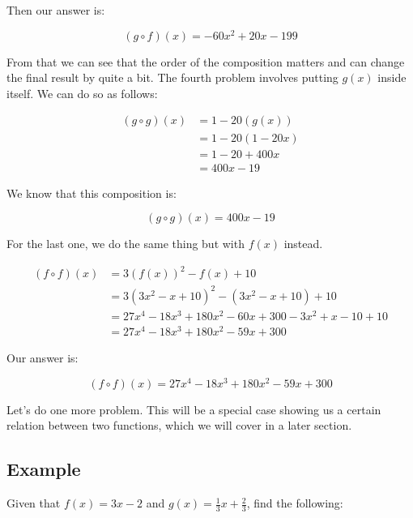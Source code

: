 \documentclass[12pt]{article}
\begin{document}
Then our answer is:

\begin{equation}
    (g \circ f)(x) = -60x^2 + 20x - 199
\end{equation}

From that we can see that the order of the composition matters and can change the final result by quite a bit.
The fourth problem involves putting $g(x)$ inside itself.
We can do so as follows:

\begin{align}
    (g \circ g)(x) & = 1 - 20(g(x))    \\
                   & = 1 - 20(1 - 20x) \\
                   & = 1 - 20 + 400x   \\
                   & = 400x - 19
\end{align}

We know that this composition is:

\begin{equation}
    (g \circ g)(x) = 400x - 19
\end{equation}

For the last one, we do the same thing but with $f(x)$ instead.

\begin{align}
    (f \circ f)(x) & = 3(f(x))^2 - f(x) + 10                                   \\
                   & = 3(3x^2 - x + 10)^2 - (3x^2 - x + 10) + 10               \\
                   & = 27x^4 - 18x^3 + 180x^2 - 60x + 300 - 3x^2 + x - 10 + 10 \\
                   & = 27x^4 - 18x^3 + 180x^2 - 59x + 300
\end{align}

Our answer is:

\begin{equation}
    (f \circ f)(x) = 27x^4 - 18x^3 + 180x^2 - 59x + 300
\end{equation}

Let's do one more problem.
This will be a special case showing us a certain relation between two functions, which we will cover in a later section.

\subsection{Example}
Given that $f(x) = 3x - 2$ and $g(x) = \frac{1}{3}x + \frac{2}{3}$, find the following:
\end{document}
